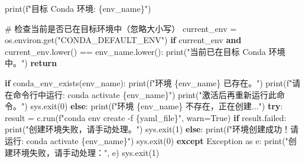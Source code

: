 \documentclass[
  letterpaper,
  DIV=11,
  numbers=noendperiod]{scrreprt}
\newenvironment{Shaded}{\begin{snugshade}}{\end{snugshade}}
\newcommand{\BuiltInTok}[1]{\textcolor[rgb]{0.00,0.23,0.31}{#1}}
\newcommand{\CommentTok}[1]{\textcolor[rgb]{0.37,0.37,0.37}{#1}}
\newcommand{\ControlFlowTok}[1]{\textcolor[rgb]{0.00,0.23,0.31}{\textbf{#1}}}
\newcommand{\DecValTok}[1]{\textcolor[rgb]{0.68,0.00,0.00}{#1}}
\newcommand{\ImportTok}[1]{\textcolor[rgb]{0.00,0.46,0.62}{#1}}
\newcommand{\KeywordTok}[1]{\textcolor[rgb]{0.00,0.23,0.31}{\textbf{#1}}}
\newcommand{\NormalTok}[1]{\textcolor[rgb]{0.00,0.23,0.31}{#1}}
\newcommand{\OperatorTok}[1]{\textcolor[rgb]{0.37,0.37,0.37}{#1}}
\newcommand{\PreprocessorTok}[1]{\textcolor[rgb]{0.68,0.00,0.00}{#1}}
\newcommand{\SpecialCharTok}[1]{\textcolor[rgb]{0.37,0.37,0.37}{#1}}
\newcommand{\SpecialStringTok}[1]{\textcolor[rgb]{0.13,0.47,0.30}{#1}}
\newcommand{\StringTok}[1]{\textcolor[rgb]{0.13,0.47,0.30}{#1}}
\newcommand{\VariableTok}[1]{\textcolor[rgb]{0.07,0.07,0.07}{#1}}
\begin{document}
\begin{Shaded}
\begin{Highlighting}[]
    \BuiltInTok{print}\NormalTok{(}\SpecialStringTok{f"目标 Conda 环境: }\SpecialCharTok{\{}\NormalTok{env\_name}\SpecialCharTok{\}}\SpecialStringTok{"}\NormalTok{)}

    \CommentTok{\# 检查当前是否已在目标环境中（忽略大小写）}
\NormalTok{    current\_env }\OperatorTok{=}\NormalTok{ os.environ.get(}\StringTok{"CONDA\_DEFAULT\_ENV"}\NormalTok{)}
    \ControlFlowTok{if}\NormalTok{ current\_env }\KeywordTok{and}\NormalTok{ current\_env.lower() }\OperatorTok{==}\NormalTok{ env\_name.lower():}
        \BuiltInTok{print}\NormalTok{(}\StringTok{"当前已在目标 Conda 环境中。"}\NormalTok{)}
        \ControlFlowTok{return}

    \ControlFlowTok{if}\NormalTok{ conda\_env\_exists(env\_name):}
        \BuiltInTok{print}\NormalTok{(}\SpecialStringTok{f"环境 \textquotesingle{}}\SpecialCharTok{\{}\NormalTok{env\_name}\SpecialCharTok{\}}\SpecialStringTok{\textquotesingle{} 已存在。"}\NormalTok{)}
        \BuiltInTok{print}\NormalTok{(}\SpecialStringTok{f"请在命令行中运行: conda activate }\SpecialCharTok{\{}\NormalTok{env\_name}\SpecialCharTok{\}}\SpecialStringTok{"}\NormalTok{)}
        \BuiltInTok{print}\NormalTok{(}\StringTok{"激活后再重新运行此命令。"}\NormalTok{)}
\NormalTok{        sys.exit(}\DecValTok{0}\NormalTok{)}
    \ControlFlowTok{else}\NormalTok{:}
        \BuiltInTok{print}\NormalTok{(}\SpecialStringTok{f"环境 \textquotesingle{}}\SpecialCharTok{\{}\NormalTok{env\_name}\SpecialCharTok{\}}\SpecialStringTok{\textquotesingle{} 不存在，正在创建..."}\NormalTok{)}
        \ControlFlowTok{try}\NormalTok{:}
\NormalTok{            result }\OperatorTok{=}\NormalTok{ c.run(}\SpecialStringTok{f"conda env create {-}f }\SpecialCharTok{\{}\NormalTok{yaml\_file}\SpecialCharTok{\}}\SpecialStringTok{"}\NormalTok{, warn}\OperatorTok{=}\VariableTok{True}\NormalTok{)}
            \ControlFlowTok{if}\NormalTok{ result.failed:}
                \BuiltInTok{print}\NormalTok{(}\StringTok{"创建环境失败，请手动处理。"}\NormalTok{)}
\NormalTok{                sys.exit(}\DecValTok{1}\NormalTok{)}
            \ControlFlowTok{else}\NormalTok{:}
                \BuiltInTok{print}\NormalTok{(}\SpecialStringTok{f"环境创建成功！请运行: conda activate }\SpecialCharTok{\{}\NormalTok{env\_name}\SpecialCharTok{\}}\SpecialStringTok{"}\NormalTok{)}
\NormalTok{                sys.exit(}\DecValTok{0}\NormalTok{)}
        \ControlFlowTok{except} \PreprocessorTok{Exception} \ImportTok{as}\NormalTok{ e:}
            \BuiltInTok{print}\NormalTok{(}\StringTok{"创建环境失败，请手动处理："}\NormalTok{, e)}
\NormalTok{            sys.exit(}\DecValTok{1}\NormalTok{)}


\end{Highlighting}
\end{Shaded}
\end{document}
